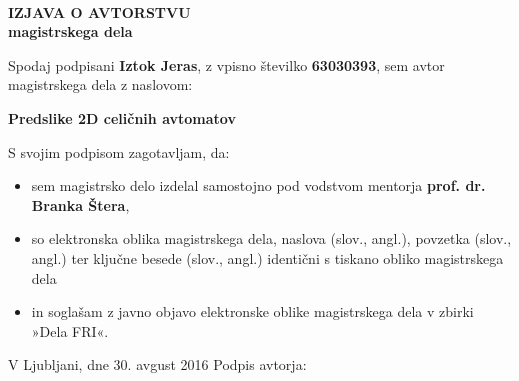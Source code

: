 \documentclass[12pt,a4paper,openany,twoside]{book}
\begin{document}
%

\ \thispagestyle{empty}
\newpage


\thispagestyle{empty}

\vspace*{2cm}
\begin{center}
{\Large \textbf{IZJAVA O AVTORSTVU \\ \vspace{0.5cm} magistrskega dela}}
\end{center}
\vspace{1cm}

Spodaj podpisani \textbf{Iztok Jeras},
z vpisno številko \textbf{63030393},
sem avtor magistrskega dela z naslovom:

\vspace{1cm}
\hspace{1cm}\textbf{Predslike 2D celičnih avtomatov}
\vspace{1cm}

S svojim podpisom zagotavljam, da:
\begin{itemize}
\item sem magistrsko delo izdelal samostojno pod vodstvom mentorja \textbf{prof. dr. Branka Štera},
\item so elektronska oblika magistrskega dela, naslova (slov., angl.), povzetka (slov., angl.) ter ključne besede (slov., angl.) identični s tiskano obliko magistrskega dela
\item in soglašam z javno objavo elektronske oblike magistrskega dela v zbirki »Dela FRI«.
\end{itemize}

\vspace{3cm}
V Ljubljani, dne 30. avgust 2016 \hfill Podpis avtorja:
\newpage 

\ \thispagestyle{empty}
\newpage
\end{document}

